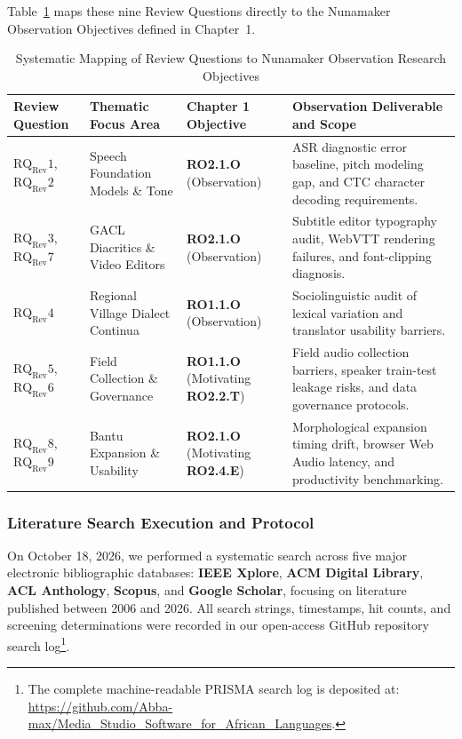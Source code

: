 \documentclass[a4paper,11pt]{article}
\begin{document}
Table~\ref{tab:rq_mapping} maps these nine Review Questions directly to the Nunamaker Observation Objectives defined in Chapter~1.

\begin{table}[t]
\centering
\small
\caption{Systematic Mapping of Review Questions to Nunamaker Observation Research Objectives}
\label{tab:rq_mapping}
\begin{tabular}{p{2.6cm} p{4.0cm} p{3.2cm} >{\raggedright\arraybackslash}p{6.8cm}}
\toprule
\textbf{Review Question} & \textbf{Thematic Focus Area} & \textbf{Chapter 1 Objective} & \textbf{Observation Deliverable and Scope} \\
\midrule
$\text{RQ}_{\text{Rev}}1$, $\text{RQ}_{\text{Rev}}2$ & Speech Foundation Models \& Tone & \textbf{RO2.1.O} (Observation) & ASR diagnostic error baseline, pitch modeling gap, and CTC character decoding requirements. \\
\addlinespace
$\text{RQ}_{\text{Rev}}3$, $\text{RQ}_{\text{Rev}}7$ & GACL Diacritics \& Video Editors & \textbf{RO2.1.O} (Observation) & Subtitle editor typography audit, WebVTT rendering failures, and font-clipping diagnosis. \\
\addlinespace
$\text{RQ}_{\text{Rev}}4$ & Regional Village Dialect Continua & \textbf{RO1.1.O} (Observation) & Sociolinguistic audit of lexical variation and translator usability barriers. \\
\addlinespace
$\text{RQ}_{\text{Rev}}5$, $\text{RQ}_{\text{Rev}}6$ & Field Collection \& Governance & \textbf{RO1.1.O} (Motivating \textbf{RO2.2.T}) & Field audio collection barriers, speaker train-test leakage risks, and data governance protocols. \\
\addlinespace
$\text{RQ}_{\text{Rev}}8$, $\text{RQ}_{\text{Rev}}9$ & Bantu Expansion \& Usability & \textbf{RO2.1.O} (Motivating \textbf{RO2.4.E}) & Morphological expansion timing drift, browser Web Audio latency, and productivity benchmarking. \\
\bottomrule
\end{tabular}
\end{table}

\subsubsection{Literature Search Execution and Protocol}
\label{sec:chap2_search_lit}
On October 18, 2026, we performed a systematic search across five major electronic bibliographic databases: \textbf{IEEE Xplore}, \textbf{ACM Digital Library}, \textbf{ACL Anthology}, \textbf{Scopus}, and \textbf{Google Scholar}, focusing on literature published between 2006 and 2026. All search strings, timestamps, hit counts, and screening determinations were recorded in our open-access GitHub repository search log\footnote{The complete machine-readable PRISMA search log is deposited at: \url{https://github.com/Abba-max/Media_Studio_Software_for_African_Languages}.}.
\end{document}
